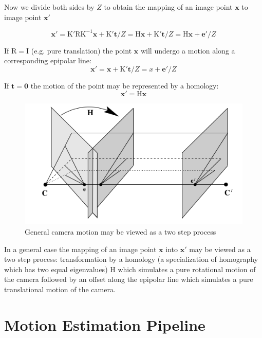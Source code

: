 \documentclass[runningheads]{llncs}
\begin{document}
Now we divide both sides by $Z$ to obtain the mapping of an image point $\mathbf{x}$ to image point $\mathbf{x}'$

\begin{equation}
  \label{eq:point_motion}
  \mathbf{x}' = \mathrm{K'RK^{-1}}\mathbf{x} + \mathrm{K'}\mathbf{t}/Z = \mathrm{H}\mathbf{x}+ \mathrm{K'}\mathbf{t}/Z = \mathrm{H}\mathbf{x} + \mathbf{e'}/Z
\end{equation}

If $\mathrm{R = I}$ (e.g. pure translation) the point $\mathbf{x}$ will undergo a motion along a corresponding epipolar line:
\begin{equation}
\mathbf{x}' = \mathbf{x}+ \mathrm{K'}\mathbf{t}/Z = x+\mathbf{e}'/Z
\end{equation}

If $\mathbf{t} = \mathbf{0}$ the motion of the point may be represented by a homology:
\[
\mathbf{x}' = \mathrm{H}\mathbf{x}
\]

\begin{figure}[h]
\includegraphics[scale=.3]{general_camera_motion}
\centering
\caption{General camera motion may be viewed as a two step process}
\end{figure}

In a general case the mapping of an image point $\mathbf{x}$ into $\mathbf{x}'$ may be viewed as a two step process: transformation by a homology (a specialization of homography which has two equal eigenvalues) $\mathrm{H}$ which simulates a pure rotational motion of the camera followed by an offset along the epipolar line which simulates a pure translational motion of the camera.

\section{Motion Estimation Pipeline}
\end{document}
